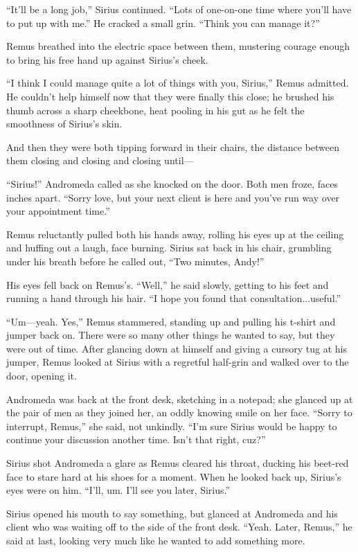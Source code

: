 “It’ll be a long job,” Sirius continued. “Lots of one-on-one time where you’ll have to put up with me.” He cracked a small grin. “Think you can manage it?”

Remus breathed into the electric space between them, mustering courage enough to bring his free hand up against Sirius’s cheek.

“I think I could manage quite a lot of things with you, Sirius,” Remus admitted. He couldn’t help himself now that they were finally this close; he brushed his thumb across a sharp cheekbone, heat pooling in his gut as he felt the smoothness of Sirius’s skin.

And then they were both tipping forward in their chairs, the distance between them closing and closing and closing until—

“Sirius!” Andromeda called as she knocked on the door. Both men froze, faces inches apart. “Sorry love, but your next client is here and you’ve run way over your appointment time.”

Remus reluctantly pulled both his hands away, rolling his eyes up at the ceiling and huffing out a laugh, face burning. Sirius sat back in his chair, grumbling under his breath before he called out, “Two minutes, Andy!”

His eyes fell back on Remus’s. “Well,” he said slowly, getting to his feet and running a hand through his hair. “I hope you found that consultation...useful.”

“Um—yeah. Yes,” Remus stammered, standing up and pulling his t-shirt and jumper back on. There were so many other things he wanted to say, but they were out of time. After glancing down at himself and giving a cursory tug at his jumper, Remus looked at Sirius with a regretful half-grin and walked over to the door, opening it.

Andromeda was back at the front desk, sketching in a notepad; she glanced up at the pair of men as they joined her, an oddly knowing smile on her face. “Sorry to interrupt, Remus,” she said, not unkindly. “I’m sure Sirius would be happy to continue your discussion another time. Isn’t that right, cuz?”

Sirius shot Andromeda a glare as Remus cleared his throat, ducking his beet-red face to stare hard at his shoes for a moment. When he looked back up, Sirius’s eyes were on him. “I’ll, um. I’ll see you later, Sirius.”

Sirius opened his mouth to say something, but glanced at Andromeda and his client who was waiting off to the side of the front desk. “Yeah. Later, Remus,” he said at last, looking very much like he wanted to add something more.

